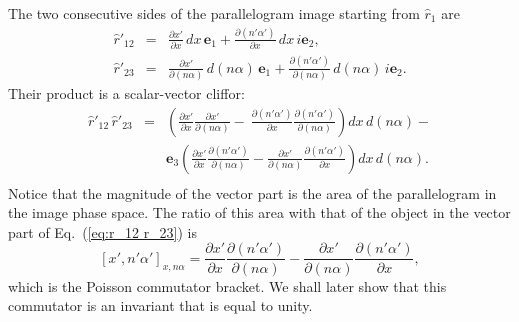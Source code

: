 \documentclass[11pt,twocolumn]{article}
\begin{document}
The two consecutive sides of the parallelogram image starting from $\hat r_1$ are
\begin{eqnarray}
\label{eq:r'_12 height angle}
\hat r'_{12}&=&\frac{\partial x'}{\partial x}\,dx\,\mathbf e_1+\frac{\partial(n'\alpha')}{\partial x}\,dx\,i\mathbf e_2,\\
\label{eq:r'_23 height angle}
\hat r'_{23}&=&\frac{\partial x'}{\partial(n\alpha)}\,d(n\alpha)\,\mathbf e_1+\frac{\partial(n'\alpha')}{\partial(n\alpha)}\,d(n\alpha)\,i\mathbf e_2.
\end{eqnarray}
Their product is a scalar-vector cliffor:
\begin{eqnarray}
\label{eq:dr'_12 dr'_23 height angle}
\hat r'_{12}\,\hat r'_{23}\!\!\!\!&=&\!\!\!\!\left(\frac{\partial x'}{\partial x}\frac{\partial x'}{\partial(n\alpha)}-\ \frac{\partial(n'\alpha')}{\partial x}\frac{\partial(n'\alpha')}{\partial(n\alpha)}\right)dx\,d(n\alpha)-\nonumber\\
& &\!\!\!\!\mathbf e_3\left(\frac{\partial x'}{\partial x}\frac{\partial(n'\alpha')}{\partial(n\alpha)}-\frac{\partial x'}{\partial(n\alpha)}\frac{\partial(n'\alpha')}{\partial x}\right) dx\,d(n\alpha).\nonumber\\
\end{eqnarray}
Notice that the magnitude of the vector part is the area of the parallelogram in the image phase space.  The ratio of this area with that of the object in the vector part of Eq.~(\ref{eq:r_12 r_23}) is 
\begin{equation}
\label{eq:Poisson bracket commutator x' n'alpha' wrt x nalpha}
[x',n'\alpha']_{x,n\alpha}=\frac{\partial x'}{\partial x}\frac{\partial(n'\alpha')}{\partial(n\alpha)}-\frac{\partial x'}{\partial(n\alpha)}\frac{\partial(n'\alpha')}{\partial x},
\end{equation}
which is the Poisson commutator bracket.  We shall later show that this commutator is an invariant\cite{Goodman_1995_HandbookofOpticsI_ch1p71} that is equal to unity.
\end{document}
